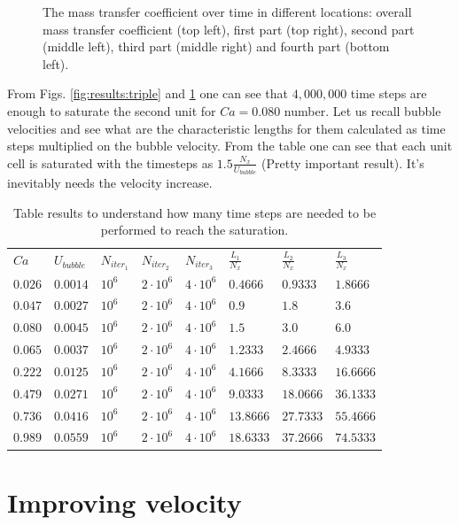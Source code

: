 \documentclass{article}
\begin{document}
\begin{figure}[htb!]
\caption{The mass transfer coefficient over time in different locations: overall mass transfer
coefficient (top left), first part (top right), second part (middle left), third part (middle
right) and fourth part (bottom left). \label{fig:results:quadro}}
\end{figure}

From Figs. \ref{fig:results:triple} and \ref{fig:results:quadro} one can see that $4,000,000$ time
steps are enough to saturate the second unit for $Ca=0.080$ number. Let us recall bubble velocities
and see what are the characteristic lengths for them calculated as time steps multiplied on the
bubble velocity. From the table one can see that each unit cell is saturated with the timesteps as
$1.5 \frac{N_x}{U_{bubble}}$ {\color{red}(Pretty important result)}. It's inevitably needs the
velocity increase.
\begin{table}[htb!]
\begin{tabularx}{\textwidth}{|X|X|X|X|X|X|X|X|}
\hline
$Ca$ &$U_{bubble}$ &$N_{iter_1}$ &$N_{iter_2}$ &$N_{iter_3}$ &$\frac{L_1}{N_x}$&$\frac{L_2}{N_x}$ 
&$\frac{L_3}{N_x}$\\
$0.026$&$0.0014$&$10^6$&$2\cdot10^6$&$4\cdot10^6$&$0.4666$ &$0.9333$ &$1.8666 $\\
$0.047$&$0.0027$&$10^6$&$2\cdot10^6$&$4\cdot10^6$&$0.9$    &$1.8$    &$3.6    $\\
$0.080$&$0.0045$&$10^6$&$2\cdot10^6$&$4\cdot10^6$&$1.5$    &$3.0$    &$6.0    $\\
$0.065$&$0.0037$&$10^6$&$2\cdot10^6$&$4\cdot10^6$&$1.2333$ &$2.4666$ &$4.9333 $\\
$0.222$&$0.0125$&$10^6$&$2\cdot10^6$&$4\cdot10^6$&$4.1666$ &$8.3333$ &$16.6666$\\
$0.479$&$0.0271$&$10^6$&$2\cdot10^6$&$4\cdot10^6$&$9.0333$ &$18.0666$&$36.1333$\\
$0.736$&$0.0416$&$10^6$&$2\cdot10^6$&$4\cdot10^6$&$13.8666$&$27.7333$&$55.4666$\\
$0.989$&$0.0559$&$10^6$&$2\cdot10^6$&$4\cdot10^6$&$18.6333$&$37.2666$&$74.5333$\\
\hline
\end{tabularx}
\caption{Table results to understand how many time steps are needed to be performed to reach the
saturation.\label{table:time:steps}}
\end{table}

\section{Improving velocity}
\end{document}
